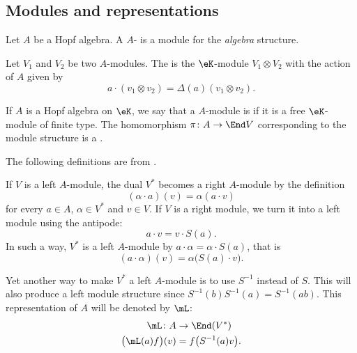 \subsection{Modules and representations}
\label{SubSecMOdulREepe}

\begin{definition}
	Let \( A\) be a Hopf algebra. A \( A\)- is a module for the \emph{algebra} structure.
\end{definition}

Let \( V_1\) and \( V_2\) be two \( A\)-modules. The  is the \( \eK\)-module \( V_1\otimes V_2\) with the action of \( A\) given by
\begin{equation}
	a\cdot(v_1\otimes v_2)=\Delta(a)(v_1\otimes v_2).
\end{equation}

If \( A\) is a Hopf algebra on \( \eK\), we say that a \( A\)-module is  if it is a free \( \eK\)-module of finite type. The homomorphism \( \pi\colon A\to \End V\) corresponding to the module structure is a .

The following definitions are from \cite{RolandVertignioux}.

If \( V\) is a left \( A\)-module, the dual \( V^*\) becomes a right \( A\)-module by the definition
\begin{equation}
	(\alpha\cdot a)(v)=\alpha(a\cdot v)
\end{equation}
for every \( a\in A\), \( \alpha\in V^*\) and \( v\in V\). If \( V\) is a right module, we turn it into a left module using the antipode:
\begin{equation}
	a\cdot v=v\cdot S(a).
\end{equation}
In such a way, \( V^*\) is a left \( A\)-module by \( a\cdot\alpha=\alpha\cdot S(a)\), that is
\begin{equation}        \label{EqDefacctrleftUqGLstat}
	(a\cdot \alpha)(v)=\alpha\big( S(a)\cdot v \big).
\end{equation}

Yet another way to make \( V^*\) a left \( A\)-module is to use \( S^{-1}\) instead of \( S\). This will also produce a left module structure since \( S^{-1}(b)S^{-1}(a)=S^{-1}(ab)\). This representation of \( A\) will be denoted by \( \mL\):
\begin{equation}        \label{EqDefTroisleftmodAstar}
	\begin{aligned}
		\mL\colon A            & \to \End(V^*)             \\
		\big( \mL(a)f \big)(v) & =f\big( S^{-1}(a)v \big).
	\end{aligned}
\end{equation}

